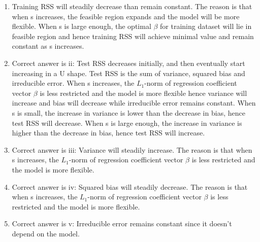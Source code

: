 \documentclass[12pt]{article}
\begin{document}
\begin{enumerate}[label=\alph*)]
   \item
   Training RSS will steadily decrease than remain constant. The reason is that when s increases, the feasible region expands and the model will be more flexible. When s is large enough, the optimal $\beta$ for training dataset will lie in feasible region and hence training RSS will achieve minimal value and remain constant as s increases. 
   \item
   Correct answer is ii: Test RSS decreases initially, and then eventually start increasing in a U shape. Test RSS is the sum of variance, squared bias and irreducible error. When s increases, the $L_1$-norm of regression coefficient vector $\beta$ is less restricted and the model is more flexible hence variance will increase and bias will decrease while irreducible error remains constant. When s is small, the increase in variance is lower than the decrease in bias, hence test RSS will decrease. When s is large enough, the increase in variance is higher than the decrease in bias, hence test RSS will increase.    
   \item 
   Correct answer is iii: Variance will steadily increase. The reason is that when s increases, the $L_1$-norm of regression coefficient vector $\beta$ is less restricted and the model is more flexible.
   \item 
   Correct answer is iv: Squared bias will steadily decrease. The reason is that when s increases, the $L_1$-norm of regression coefficient vector $\beta$ is less restricted and the model is more flexible.
   \item
   Correct answer is v: Irreducible error remains constant since it doesn't depend on the model.
\end{enumerate} 
 
\end{document}

